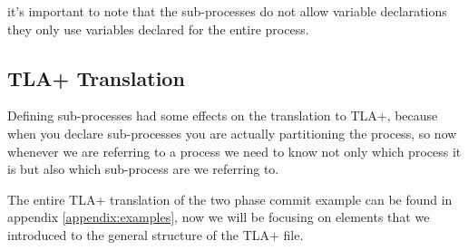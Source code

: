 \documentclass{thesul}
\begin{document}
it's important to note that the sub-processes do not allow variable declarations they only use variables declared for the entire process.

\subsection{TLA+ Translation}

Defining sub-processes had some effects on the translation to TLA+, because when you declare sub-processes you are actually partitioning the process, so now whenever we are referring to a process we need to know not only which process it is but also which sub-process are we referring to.
 
The entire TLA+ translation of the two phase commit example can be found in appendix \ref{appendix:examples}, now we will be focusing on elements that we introduced to the general structure of the TLA+ file.
\end{document}
